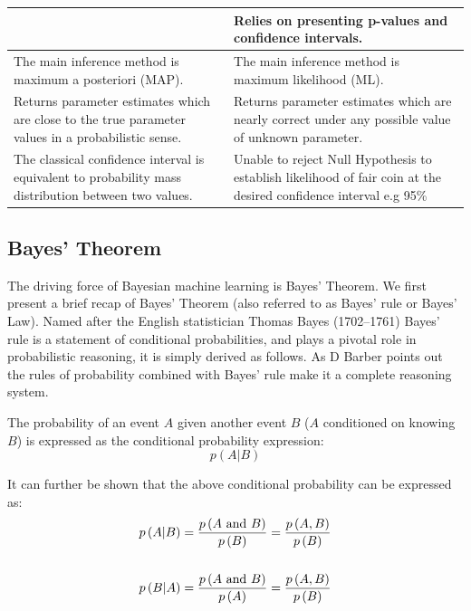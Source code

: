 \begin{table}[!ht]
\begin{tabular}{
        >{\raggedright\arraybackslash}p{}
        >{\raggedright\arraybackslash}p{}
        }
        &
        Relies on presenting p-values and confidence intervals.
        \\
        \midrule
        The main inference method is maximum a posteriori (MAP).
        &
        The main inference method is maximum likelihood (ML).
        \\
        \midrule
        Returns parameter estimates which are close to the true parameter values in a probabilistic sense.
        &
        Returns parameter estimates which are nearly correct under any possible value of unknown parameter.
        \\
        \midrule
        The classical confidence interval is equivalent to probability mass distribution between two values.
        &
        Unable to reject Null Hypothesis to establish likelihood of fair coin at the desired confidence interval e.g 95\%
        \\
        \bottomrule
  \end{tabular}
\end{table}


\subsection{Bayes' Theorem}

The driving force of Bayesian machine learning is Bayes' Theorem. We first present a brief recap of Bayes' Theorem (also referred to as Bayes' rule or Bayes' Law). Named after the English statistician Thomas Bayes (1702--1761) Bayes' rule is a statement of conditional probabilities, and plays a pivotal role in probabilistic reasoning, it is simply derived as follows. As D Barber \autocite{barberBRML2012} points out the rules of probability combined with Bayes' rule make it a complete reasoning system.

The probability of an event $A$ given another event $B$ ($A$ conditioned on knowing $B$) is expressed as the conditional probability expression:
\begin{equation}\label{Ch3Eq0}
    p\left( A|B \right)
\end{equation}

It can further be shown that the above conditional probability can be expressed as:
\begin{align}
    p\left( A|B \right) & = \dfrac{p \left( A\text{ and }B \right)}{p\left( B \right)} = \dfrac{p\left( A,B \right)}{p\left( B \right)} \label{Ch3Eq1}\\
    &\strut\nonumber\\
    p\left( B|A \right) & = \dfrac{p \left( A\text{ and }B \right)}{p\left( A \right)} = \dfrac{p\left( A,B \right)}{p\left( B \right)} \label{Ch3Eq2}
\end{align}

